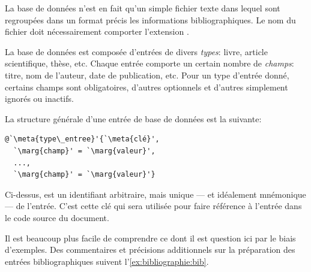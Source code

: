 La base de données n'est en fait qu'un simple fichier texte dans
lequel sont regroupées dans un format précis les informations
bibliographiques. Le nom du fichier doit nécessairement comporter
l'extension .

La base de données est composée d'entrées de divers \emph{types}:
livre, article scientifique, thèse, etc. Chaque entrée comporte un
certain nombre de \emph{champs}: titre, nom de l'auteur, date de
publication, etc. Pour un type d'entrée donné, certains champs sont
obligatoires, d'autres optionnels et d'autres simplement ignorés ou
inactifs.

La structure générale d'une entrée de base de données est la suivante:
\begin{lstlisting}
@`\meta{type\_entree}'{`\meta{clé}',
  `\marg{champ}' = `\marg{valeur}',
  ...,
  `\marg{champ}' = `\marg{valeur}'}
\end{lstlisting}
Ci-dessus,  est un identifiant arbitraire, mais unique ---
et idéalement mnémonique --- de l'entrée. C'est cette clé qui sera
utilisée pour faire référence à l'entrée dans le code source du
document.

Il est beaucoup plus facile de comprendre ce dont il est question ici
par le biais d'exemples. Des commentaires et précisions additionnels sur la
préparation des entrées bibliographiques suivent l'\autoref*{ex:bibliographie:bib}.

